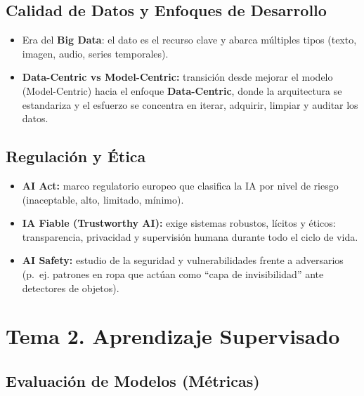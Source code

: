 \documentclass[12pt]{book} %
\providecommand{\tightlist}{%
  \setlength{\itemsep}{0pt}\setlength{\parskip}{0pt}}
\begin{document}
\hypertarget{calidad-de-datos-y-enfoques-de-desarrollo}{%
\subsection{Calidad de Datos y Enfoques de
Desarrollo}\label{calidad-de-datos-y-enfoques-de-desarrollo}}

\begin{itemize}
\tightlist
\item
  Era del \textbf{Big Data}: el dato es el recurso clave y abarca
  múltiples tipos (texto, imagen, audio, series temporales).
\item
  \textbf{Data-Centric vs Model-Centric:} transición desde mejorar el
  modelo (Model-Centric) hacia el enfoque \textbf{Data-Centric}, donde
  la arquitectura se estandariza y el esfuerzo se concentra en iterar,
  adquirir, limpiar y auditar los datos.
\end{itemize}

\hypertarget{regulaciuxf3n-y-uxe9tica}{%
\subsection{Regulación y Ética}\label{regulaciuxf3n-y-uxe9tica}}

\begin{itemize}
\tightlist
\item
  \textbf{AI Act:} marco regulatorio europeo que clasifica la IA por
  nivel de riesgo (inaceptable, alto, limitado, mínimo).
\item
  \textbf{IA Fiable (Trustworthy AI):} exige sistemas robustos, lícitos
  y éticos: transparencia, privacidad y supervisión humana durante todo
  el ciclo de vida.
\item
  \textbf{AI Safety:} estudio de la seguridad y vulnerabilidades frente
  a adversarios (p.~ej. patrones en ropa que actúan como ``capa de
  invisibilidad'' ante detectores de objetos).
\end{itemize}

\hypertarget{tema-2.-aprendizaje-supervisado}{%
\section{Tema 2. Aprendizaje
Supervisado}\label{tema-2.-aprendizaje-supervisado}}

\hypertarget{evaluaciuxf3n-de-modelos-muxe9tricas}{%
\subsection{Evaluación de Modelos
(Métricas)}\label{evaluaciuxf3n-de-modelos-muxe9tricas}}
\end{document}
